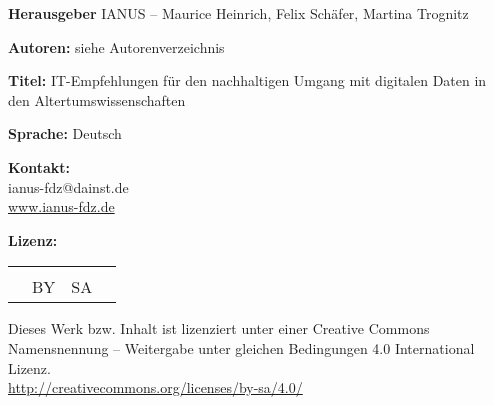\newcommand{\tbsf}[1]{{\color{ianusBlau}\sffamily\normalsize#1}}

\newcommand{\tbsff}[1]{{\color{ianusBlau}\sffamily\bfseries#1}}

\renewcommand{\arraystretch}{1.2}

\thispagestyle{empty}

\begin{flushleft}
\tbsff{Herausgeber} IANUS -- Maurice Heinrich, Felix Schäfer, Martina Trognitz \vspace{2mm}

\tbsff{Autoren:} siehe Autorenverzeichnis \vspace{2mm}

\tbsff{Titel:} IT-Empfehlungen für den nachhaltigen Umgang mit digitalen Daten in den Altertumswissenschaften \vspace{2mm}

\tbsff{Sprache:} Deutsch \vspace{4mm}


\end{flushleft}

\begin{center}
\end{center}%

\begin{flushleft}

\tbsff{Kontakt:}\\
ianus-fdz@dainst.de\\
\url{www.ianus-fdz.de}\\ \vspace{5mm}

\tbsff{Lizenz:} \vspace{3mm}

\setlength{\tabcolsep}{0.5pt}
\begin{tabular}{c c c c}
	\multirow{2}{*}{\raisebox{2.5mm}{\color{ianusBlau} \Huge \ccLogo}} 	& {\color{ianusBlau} \large \ccAttribution}		& {\color{ianusBlau} \large \ccShareAlike} \\
	 																									& \color{ianusBlau} \sffamily \scriptsize BY	& \color{ianusBlau} \sffamily \scriptsize SA \\
\end{tabular}

\vspace{2mm} Dieses Werk bzw. Inhalt ist lizenziert unter einer Creative Commons Namensnennung -- Weitergabe unter gleichen Bedingungen 4.0 International Lizenz. \\
\url{http://creativecommons.org/licenses/by-sa/4.0/}
\end{flushleft}

